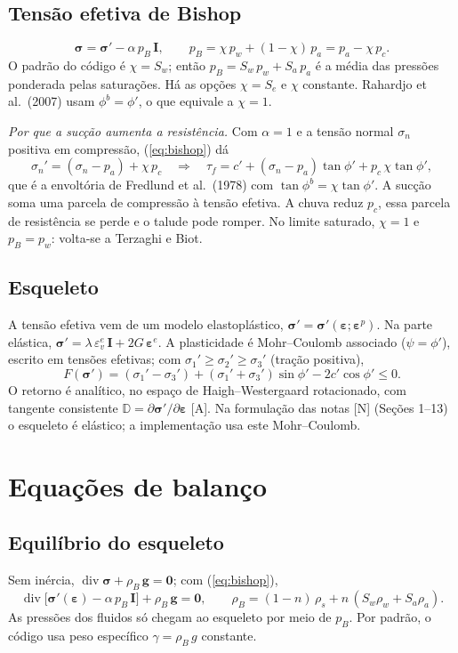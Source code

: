 \documentclass[11pt,a4paper]{article}
\newcommand{\vg}{\bm g}
\newcommand{\tsig}{\bm\sigma}
\newcommand{\teps}{\bm\varepsilon}
\newcommand{\tI}{\bm I}
\newcommand{\dv}{\operatorname{div}}
\begin{document}
\subsection{Tensão efetiva de Bishop}
\begin{equation}
\tsig=\tsig'-\alpha\,p_B\,\tI,\qquad
p_B=\chi\,p_w+(1-\chi)\,p_a=p_a-\chi\,p_c .
\label{eq:bishop}
\end{equation}
O padrão do código é $\chi=S_w$; então $p_B=S_w\,p_w+S_a\,p_a$ é a média das
pressões ponderada pelas saturações. Há as opções $\chi=S_e$ e $\chi$ constante.
Rahardjo et al.\ (2007) usam $\phi^b=\phi'$, o que equivale a $\chi=1$.

\emph{Por que a sucção aumenta a resistência.} Com $\alpha=1$ e a tensão normal
$\sigma_n$ positiva em compressão, (\ref{eq:bishop}) dá
\[
\sigma_n'=(\sigma_n-p_a)+\chi\,p_c
\quad\Longrightarrow\quad
\tau_f=c'+(\sigma_n-p_a)\tan\phi'+p_c\,\chi\tan\phi' ,
\]
que é a envoltória de Fredlund et al.\ (1978) com $\tan\phi^b=\chi\tan\phi'$. A sucção
soma uma parcela de compressão à tensão efetiva. A chuva reduz $p_c$, essa parcela
de resistência se perde e o talude pode romper. No limite saturado, $\chi=1$ e
$p_B=p_w$: volta-se a Terzaghi e Biot.

\subsection{Esqueleto}
A tensão efetiva vem de um modelo elastoplástico, $\tsig'=\tsig'(\teps;\teps^p)$.
Na parte elástica, $\tsig'=\lambda\,\varepsilon^e_v\,\tI+2G\,\teps^e$. A plasticidade
é Mohr--Coulomb associado ($\psi=\phi'$), escrito em tensões efetivas; com
$\sigma_1'\ge\sigma_2'\ge\sigma_3'$ (tração positiva),
\[
F(\tsig')=(\sigma_1'-\sigma_3')+(\sigma_1'+\sigma_3')\sin\phi'-2c'\cos\phi'\le 0 .
\]
O retorno é analítico, no espaço de Haigh--Westergaard rotacionado, com tangente
consistente $\mathbb D=\partial\tsig'/\partial\teps$ [A]. Na formulação das notas [N]
(Seções 1--13) o esqueleto é elástico; a implementação usa este Mohr--Coulomb.

\section{Equações de balanço}

\subsection{Equilíbrio do esqueleto}
Sem inércia, $\dv\tsig+\rho_B\,\vg=\bm 0$; com (\ref{eq:bishop}),
\begin{equation}
\dv\big[\tsig'(\teps)-\alpha\,p_B\,\tI\big]+\rho_B\,\vg=\bm 0,
\qquad \rho_B=(1-n)\,\rho_s+n\,(S_w\rho_w+S_a\rho_a).
\label{eq:equilibrio}
\end{equation}
As pressões dos fluidos só chegam ao esqueleto por meio de $p_B$. Por padrão, o
código usa peso específico $\gamma=\rho_B\,g$ constante.
\end{document}
